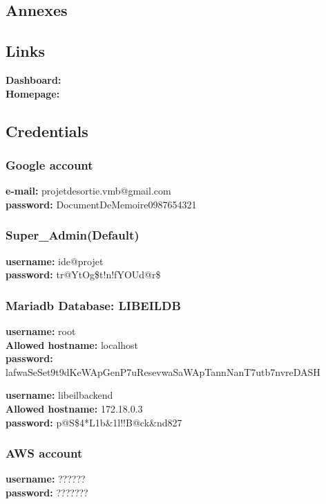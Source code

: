 \begin{appendices}
	\chapter{Annexes}

		\section{Links}
			\textbf{Dashboard:} \dashboardURL\\
			\indent\textbf{Homepage:} \websiteURL


		\section{Credentials}
			\subsection{Google account}
				\textbf{e-mail:} projetdesortie.vmb@gmail.com\\
				\indent\textbf{password:} DocumentDeMemoire0987654321

			\subsection{Super\_Admin(Default)}
				\textbf{username:} ide@projet\\
				\indent\textbf{password:} tr@YtOg\$t!n!fYOUd@r\$

			\subsection{Mariadb Database: LIBEILDB}
				\textbf{username:} root\\
				\indent\textbf{Allowed hostname:} localhost\\
				\indent\textbf{password:} lafwaSeSet9t9dKeWApGenP7uResevwaSaWApTannNanT7utb7nvreDASH
				\vskip 10pt

				\indent\textbf{username:} libeilbackend \\
				\indent\textbf{Allowed hostname:} 172.18.0.3 \\
				\indent\textbf{password:} p@S\$4*L1b\&1l!!B@ck\&nd827

			\subsection{AWS account}
				\textbf{username:} ?????? \\
				\indent\textbf{password:} ???????


\end{appendices}
